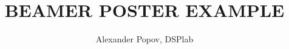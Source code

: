 \documentclass[xcolor=dvipsnames]{beamer}
\title{\Large BEAMER POSTER EXAMPLE}
\author{\large Alexander Popov, DSPlab}
\institute{}
\date{}
\begin{document}
\begin{frame}{}

\begin{beamercolorbox}{}
\maketitle
\end{beamercolorbox}



\end{frame}
\end{document}
